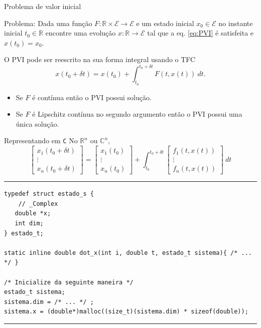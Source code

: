 \documentclass{beamer}
\begin{document}
\begin{frame}{Problema de valor inicial}

   Problema: Dada uma função
   $F:\mathbb R\times\mathcal E\rightarrow\mathcal E$ e
   um estado inicial $x_0\in\mathcal E$
   no instante inicial $t_0\in\mathbb R$
   encontre uma evolução $x:\mathbb R\rightarrow\mathcal E$
   tal que a eq. \ref{eq:PVI} é satisfeita e $x(t_0) = x_0$.

   \vfill

   O PVI pode ser reescrito na sua forma integral usando o TFC
   \begin{equation}
      x(t_0 + \delta t) = x(t_0) +
      \int_{t_0}^{t_0 + \delta t} F(t, x(t)) ~ dt.
   \end{equation}

   \vfill

   \begin{itemize}
      \item Se $F$ é contínua então o PVI possui solução.
      \item Se $F$ é Lipschitz contínua no segundo argumento
      então o PVI possui uma única solução.
   \end{itemize}
\end{frame}

\begin{frame}[fragile]{Representando em \texttt C}
   No $\mathbb R^n$ ou $\mathbb C^n$,
   \[
      \begin{bmatrix}
         x_1(t_0 + \delta t) \\ \vdots \\ x_n(t_0 + \delta t)
      \end{bmatrix} =
      \begin{bmatrix} x_1(t_0) \\ \vdots \\ x_n(t_0) \end{bmatrix} +
      \int_{t_0}^{t_0 + \delta t}
      \begin{bmatrix}
         f_1(t, x(t)) \\ \vdots \\ f_n(t, x(t))
      \end{bmatrix} ~ dt
   \]

   \rule{\textwidth}{1pt}
   \scriptsize
\begin{lstlisting}[style = c]
typedef struct estado_s {
    // _Complex
   double *x;
   int dim;
} estado_t;

static inline double dot_x(int i, double t, estado_t sistema){ /* ... */ }

/* Inicialize da seguinte maneira */
estado_t sistema;
sistema.dim = /* ... */ ;
sistema.x = (double*)malloc((size_t)(sistema.dim) * sizeof(double));
\end{lstlisting}
   \rule{\textwidth}{1pt}

\end{frame}
\end{document}
